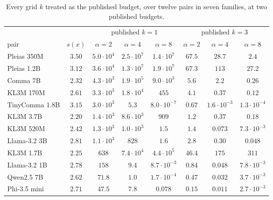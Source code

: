 \begin{table}[ht]
\centering\footnotesize
\caption{Every grid $k$ treated as the published budget, over twelve pairs in seven families, at two published budgets.}\label{tab:orderlaw}
\setlength{\tabcolsep}{4pt}
\begin{tabular}{@{}lccccccc@{}}
\toprule
& & \multicolumn{3}{c}{published $k = 1$} & \multicolumn{3}{c}{published $k = 3$} \\
\cmidrule(lr){3-5}\cmidrule(lr){6-8}
pair & $s(x)$ & $\alpha{=}2$ & $\alpha{=}4$ & $\alpha{=}8$ & $\alpha{=}2$ & $\alpha{=}4$ & $\alpha{=}8$ \\
\midrule
Pleias 350M    & $3.50$ & $5.0{\cdot}10^{4}$ & $2.5{\cdot}10^{7}$ & $1.4{\cdot}10^{7}$ & $67.5$ & $28.7$ & $2.4$ \\
Pleias 1.2B    & $3.12$ & $3.6{\cdot}10^{4}$ & $1.3{\cdot}10^{7}$ & $1.9{\cdot}10^{7}$ & $67.3$ & $113$ & $27.2$ \\
Comma 7B       & $2.32$ & $4.3{\cdot}10^{3}$ & $1.9{\cdot}10^{5}$ & $9.0{\cdot}10^{3}$ & $5.6$ & $2.2$ & $0.26$ \\
KL3M 170M      & $2.61$ & $3.3{\cdot}10^{3}$ & $1.8{\cdot}10^{4}$ & $455$ & $4.1$ & $0.37$ & $0.12$ \\
TinyComma 1.8B & $3.15$ & $3.0{\cdot}10^{3}$ & $5.3$ & $8.0{\cdot}10^{-7}$ & $0.67$ & $1.6{\cdot}10^{-3}$ & $1.3{\cdot}10^{-4}$ \\
KL3M 3.7B      & $2.20$ & $1.4{\cdot}10^{3}$ & $8.6{\cdot}10^{3}$ & $909$ & $1.2$ & $0.37$ & $0.18$ \\
KL3M 520M      & $2.42$ & $1.3{\cdot}10^{3}$ & $1.0{\cdot}10^{3}$ & $1.5$ & $1.4$ & $0.073$ & $7.3{\cdot}10^{-3}$ \\
Llama-3.2 3B   & $2.81$ & $1.1{\cdot}10^{3}$ & $828$ & $1.6$ & $2.8$ & $0.30$ & $0.048$ \\
KL3M 1.7B      & $2.25$ & $638$ & $7.4{\cdot}10^{4}$ & $4.4{\cdot}10^{5}$ & $46.4$ & $175$ & $311$ \\
Llama-3.2 1B   & $2.78$ & $158$ & $9.4$ & $8.7{\cdot}10^{-3}$ & $0.84$ & $0.048$ & $7.8{\cdot}10^{-3}$ \\
Qwen2.5 7B     & $2.62$ & $71.8$ & $1.0$ & $1.7{\cdot}10^{-4}$ & $0.47$ & $0.032$ & $3.7{\cdot}10^{-3}$ \\
Phi-3.5 mini   & $2.71$ & $47.5$ & $7.8$ & $0.078$ & $0.15$ & $0.011$ & $2.7{\cdot}10^{-3}$ \\
\bottomrule
\end{tabular}
\end{table}

